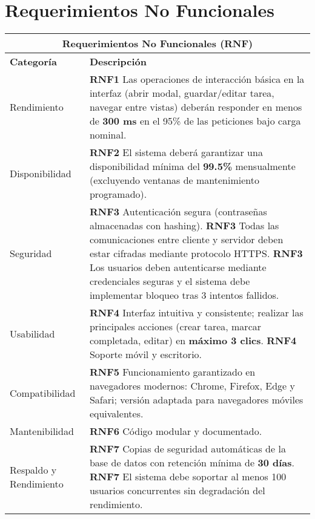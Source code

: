 \documentclass[11pt]{article}
\begin{document}
\section{Requerimientos No Funcionales}
\begin{table}[H]
    \centering
    \begin{tabular}{|p{3cm}|p{12cm}|}
    \hline
    \multicolumn{2}{|c|}{\textbf{Requerimientos No Funcionales (RNF)}} \\
    \hline
    \textbf{Categoría} & \textbf{Descripción} \\
    \hline
    Rendimiento & \textbf{RNF1} Las operaciones de interacción básica en la interfaz (abrir modal, guardar/editar tarea, navegar entre vistas) deberán responder en menos de \textbf{300 ms} en el 95\% de las peticiones bajo carga nominal. \\ 
    \hline
    Disponibilidad & \textbf{RNF2} El sistema deberá garantizar una disponibilidad mínima del \textbf{99.5\%} mensualmente (excluyendo ventanas de mantenimiento programado). \\ 
    \hline
    Seguridad & \textbf{RNF3} Autenticación segura (contraseñas almacenadas con hashing). \newline
                \textbf{RNF3} Todas las comunicaciones entre cliente y servidor deben estar cifradas mediante protocolo HTTPS. \newline
                \textbf{RNF3} Los usuarios deben autenticarse mediante credenciales seguras y el sistema debe implementar bloqueo tras 3 intentos fallidos. \\ 
    \hline
    Usabilidad & \textbf{RNF4} Interfaz intuitiva y consistente; realizar las principales acciones (crear tarea, marcar completada, editar) en \textbf{máximo 3 clics}. \newline
                \textbf{RNF4} Soporte móvil y escritorio. \\ 
    \hline
    Compatibilidad & \textbf{RNF5} Funcionamiento garantizado en navegadores modernos: Chrome, Firefox, Edge y Safari; versión adaptada para navegadores móviles equivalentes. \\ 
    \hline
    Mantenibilidad & \textbf{RNF6} Código modular y documentado.\\ 
    \hline
    Respaldo y Rendimiento & \textbf{RNF7} Copias de seguridad automáticas de la base de datos con retención mínima de \textbf{30 días}. \newline
                             \textbf{RNF7} El sistema debe soportar al menos 100 usuarios concurrentes sin degradación del rendimiento.\\ 

\end{tabular}
\end{table}
\end{document}
